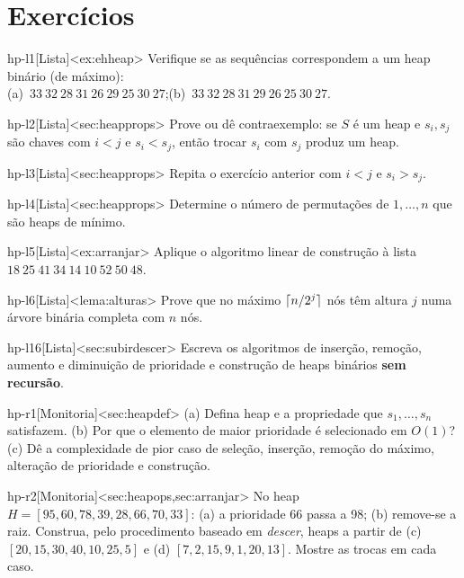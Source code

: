 \section{Exercícios}
\excurso
\begin{exercicio}{hp-l1}[Lista]<ex:ehheap>
Verifique se as sequências correspondem a um heap binário (de máximo):\\
(a)~$33\ 32\ 28\ 31\ 26\ 29\ 25\ 30\ 27$;\qquad (b)~$33\ 32\ 28\ 31\ 29\ 26\ 25\ 30\ 27$.
\end{exercicio}
\begin{exercicio}{hp-l2}[Lista]<sec:heapprops>
Prove ou dê contraexemplo: se $S$ é um heap e $s_i,s_j$ são chaves com $i<j$ e $s_i<s_j$, então trocar $s_i$ com $s_j$ produz um heap.
\end{exercicio}
\begin{exercicio}{hp-l3}[Lista]<sec:heapprops>
Repita o exercício anterior com $i<j$ e $s_i>s_j$.
\end{exercicio}
\begin{exercicio}{hp-l4}[Lista]<sec:heapprops>
Determine o número de permutações de $1,\dots,n$ que são heaps de mínimo.
\end{exercicio}
\begin{exercicio}{hp-l5}[Lista]<ex:arranjar>
Aplique o algoritmo linear de construção à lista $18\ 25\ 41\ 34\ 14\ 10\ 52\ 50\ 48$.
\end{exercicio}
\begin{exercicio}{hp-l6}[Lista]<lema:alturas>
Prove que no máximo $\lceil n/2^j\rceil$ nós têm altura $j$ numa árvore binária completa com $n$ nós.
\end{exercicio}
\begin{exercicio}{hp-l16}[Lista]<sec:subirdescer>
Escreva os algoritmos de inserção, remoção, aumento e diminuição de prioridade e construção de heaps binários \textbf{sem recursão}.
\end{exercicio}
\begin{exercicio}{hp-r1}[Monitoria]<sec:heapdef>
(a) Defina heap e a propriedade que $s_1,\dots,s_n$ satisfazem. (b) Por que o elemento de maior prioridade é selecionado em $O(1)$? (c) Dê a complexidade de pior caso de seleção, inserção, remoção do máximo, alteração de prioridade e construção.
\end{exercicio}
\begin{exercicio}{hp-r2}[Monitoria]<sec:heapops,sec:arranjar>
No heap $H=[95,60,78,39,28,66,70,33]$: (a) a prioridade 66 passa a 98; (b) remove-se a raiz. Construa, pelo procedimento baseado em \emph{descer}, heaps a partir de (c) $[20,15,30,40,10,25,5]$ e (d) $[7,2,15,9,1,20,13]$. Mostre as trocas em cada caso.
\end{exercicio}
